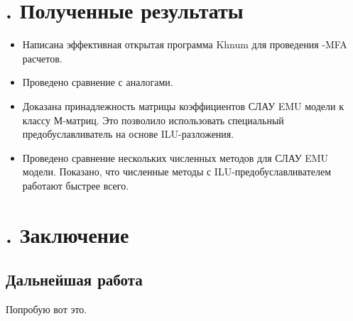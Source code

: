 \documentclass[14pt, a4paper]{extreport}
\begin{document}
\chapter[Полученные результаты]{\thechapter{}. Полученные результаты}
\begin{itemize}
	\item Написана эффективная открытая программа Khnum для проведения -MFA расчетов.
	\item Проведено сравнение с аналогами.
	\item Доказана принадлежность матрицы коэффициентов СЛАУ EMU модели к классу М-матриц. Это позволило использовать специальный предобуславливатель на основе ILU-разложения.
	\item Проведено сравнение нескольких численных методов для СЛАУ EMU модели. Показано, что численные методы с ILU-предобуславливателем работают быстрее всего.
\end{itemize}


\chapter[Заключение]{\thechapter{}. Заключение}
 
\section{Дальнейшая работа}
Попробую вот это.
\end{document}
